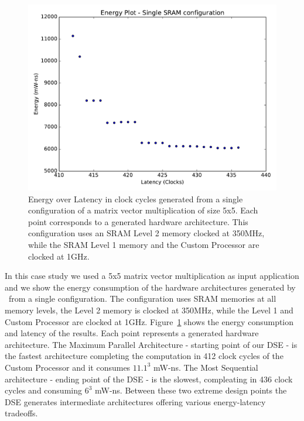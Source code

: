 \begin{figure}[tb] 
\centering
\includegraphics[width=\columnwidth]{graphs/energy_plot_single_sram.pdf}
\caption{\small Energy over Latency in clock cycles generated from a single configuration of a matrix vector multiplication of size 5x5. Each point corresponds to a generated hardware architecture. This configuration uses an SRAM Level 2 memory clocked at 350MHz, while the SRAM Level 1 memory and the Custom Processor are clocked at 1GHz.}
\label{fig:single_sram}
\end{figure}
In this case study we used a 5x5 matrix vector multiplication as input application and we show the energy consumption of the hardware architectures generated by \frameworkname~from a single configuration. The configuration uses SRAM memories at all memory levels, the Level 2 memory is clocked at 350MHz, while the Level 1 and Custom Processor are clocked at 1GHz. Figure~\ref{fig:single_sram} shows the energy consumption and latency of the results. Each point represents a generated hardware architecture. The Maximum Parallel Architecture - starting point of our DSE - is the fastest architecture completing the computation in 412 clock cycles of the Custom Processor and it consumes $11.1^3$ mW-ns. The Most Sequential architecture - ending point of the DSE - is the slowest, compleating in 436 clock cycles and consuming $6^3$ mW-ns. Between these two extreme design points the DSE generates intermediate architectures offering various energy-latency tradeoffs. 



